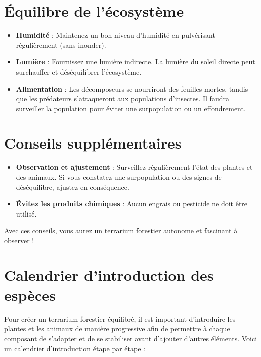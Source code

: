 \section{Équilibre de l'écosystème}
\begin{itemize}
    \item \textbf{Humidité} : Maintenez un bon niveau d'humidité en pulvérisant régulièrement (sans inonder).
    \item \textbf{Lumière} : Fournissez une lumière indirecte. La lumière du soleil directe peut surchauffer et déséquilibrer l'écosystème.
    \item \textbf{Alimentation} : Les décomposeurs se nourriront des feuilles mortes, tandis que les prédateurs s'attaqueront aux populations d'insectes. Il faudra surveiller la population pour éviter une surpopulation ou un effondrement.
\end{itemize}

\section{Conseils supplémentaires}
\begin{itemize}
    \item \textbf{Observation et ajustement} : Surveillez régulièrement l'état des plantes et des animaux. Si vous constatez une surpopulation ou des signes de déséquilibre, ajustez en conséquence.
    \item \textbf{Évitez les produits chimiques} : Aucun engrais ou pesticide ne doit être utilisé.
\end{itemize}

Avec ces conseils, vous aurez un terrarium forestier autonome et fascinant à observer !
\newpage

\section{Calendrier d'introduction des espèces}
Pour créer un terrarium forestier équilibré, il est important d'introduire les plantes et les animaux de manière progressive afin de permettre à chaque composant de s'adapter et de se stabiliser avant d'ajouter d'autres éléments. Voici un calendrier d'introduction étape par étape :

